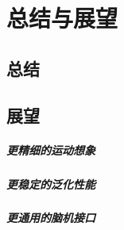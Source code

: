 
\chapter{总结与展望}

\section{总结}

\section{展望}

\paragraph{更精细的运动想象}

\paragraph{更稳定的泛化性能}

\paragraph{更通用的脑机接口}
